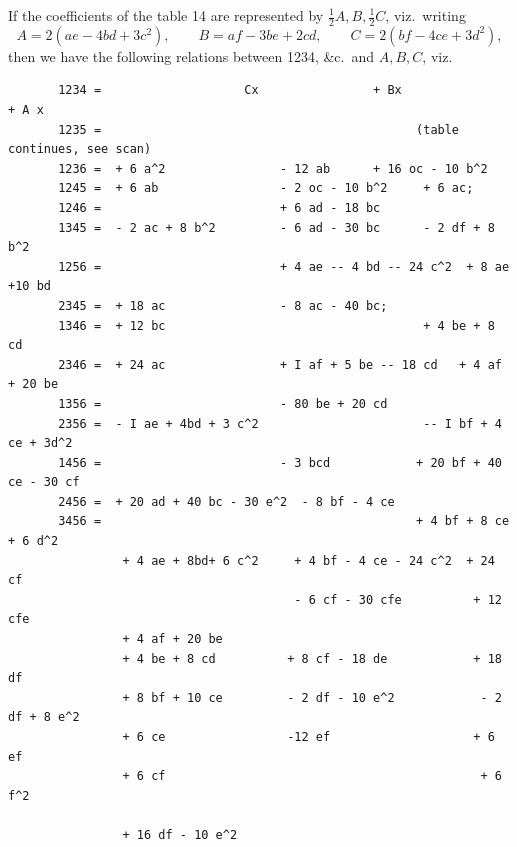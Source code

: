 \documentclass[11pt]{article}
\begin{document}
\bigskip

If the coefficients of the table 14 are represented by $\tfrac12 A, B, \tfrac12 C$, viz.\ writing
\[
A = 2(ae - 4bd + 3c^2),\qquad B = af - 3be + 2cd,\qquad C = 2(bf - 4ce + 3d^2),
\]
then we have the following relations between 1234, \&c.\ and $A, B, C$, viz.

\medskip

\begin{small}
\begin{verbatim}
       1234 =                    Cx                + Bx                 + A x
       1235 =                                            (table continues, see scan)
       1236 =  + 6 a^2                - 12 ab      + 16 oc - 10 b^2
       1245 =  + 6 ab                 - 2 oc - 10 b^2     + 6 ac;
       1246 =                         + 6 ad - 18 bc
       1345 =  - 2 ac + 8 b^2         - 6 ad - 30 bc      - 2 df + 8 b^2
       1256 =                         + 4 ae -- 4 bd -- 24 c^2  + 8 ae +10 bd
       2345 =  + 18 ac                - 8 ac - 40 bc;
       1346 =  + 12 bc                                    + 4 be + 8 cd
       2346 =  + 24 ac                + I af + 5 be -- 18 cd   + 4 af + 20 be
       1356 =                         - 80 be + 20 cd
       2356 =  - I ae + 4bd + 3 c^2                       -- I bf + 4 ce + 3d^2
       1456 =                         - 3 bcd            + 20 bf + 40 ce - 30 cf
       2456 =  + 20 ad + 40 bc - 30 e^2  - 8 bf - 4 ce
       3456 =                                            + 4 bf + 8 ce + 6 d^2
                + 4 ae + 8bd+ 6 c^2     + 4 bf - 4 ce - 24 c^2  + 24 cf
                                        - 6 cf - 30 cfe          + 12 cfe
                + 4 af + 20 be
                + 4 be + 8 cd          + 8 cf - 18 de            + 18 df
                + 8 bf + 10 ce         - 2 df - 10 e^2            - 2 df + 8 e^2
                + 6 ce                 -12 ef                    + 6 ef
                + 6 cf                                            + 6 f^2

                + 16 df - 10 e^2
\end{verbatim}
\end{small}

\medskip
\end{document}
